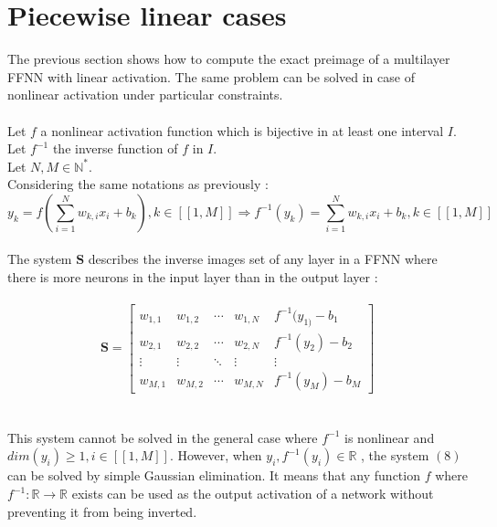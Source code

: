 \documentclass{article}
\begin{document}
\section{Piecewise linear cases}

The previous section shows how to compute the exact preimage of a multilayer FFNN with linear activation. 
The same problem can be solved in case of nonlinear activation under particular constraints.
\\
\\
Let $f$ a nonlinear activation function which is bijective in at least one interval $I$.
\\
Let $f^{-1}$ the inverse function of $f$ in $I$.
\\
Let $ N,M \in \mathbb{N^{*}}$.
\\
Considering the same notations as previously :
\
\begin{equation*}
    y_{k} = f(\sum_{i=1}^{N} w_{k,i}x_{i} + b_{k}) ,  k \in [\![1,M]\!] 
    \Rightarrow f^{-1}(y_{k}) = \sum_{i=1}^{N} w_{k,i}x_{i} + b_{k} ,  k \in [\![1,M]\!]
\end{equation*}
\\
The system $\textbf{S}$ describes the inverse images set of any layer in a FFNN where there is more neurons in the input layer than in the output layer :
\\\\
\begin{equation}
    \textbf{S}= \left[\begin{array}{cccc|c}  
    w_{1,1} & w_{1,2} & \cdots & w_{1,N} & f^{-1}(y_{1)}-b_{1} \\
    w_{2,1} & w_{2,2} & \cdots & w_{2,N} & f^{-1}(y_{2})-b_{2}\\
    \vdots  & \vdots  & \ddots & \vdots & \vdots\\
    w_{M,1} & w_{M,2} & \cdots & w_{M,N} & f^{-1}(y_{M})-b_{M}
   \end{array}\right]
\end{equation}
\\
\\
This system cannot be solved in the general case where $f^{-1}$ is nonlinear and $dim(y_{i})\geqslant 1,i \in [\![1,M]\!]$.
However, when $y_{i},f^{-1}(y_{i}) \in \mathbb{R} $ , the system $(8)$ can be solved by simple Gaussian elimination.
It means that any function $f$ where $f^{-1}:\mathbb{R} \longrightarrow \mathbb{R}$ exists can be used as the output activation of 
a network without preventing it from being inverted.
\end{document}
